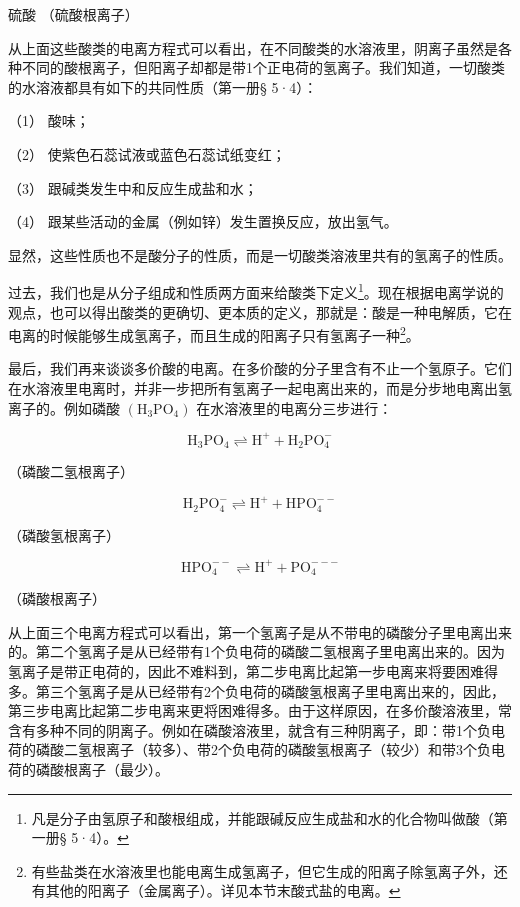 硫酸 （硫酸根离子）

从上面这些酸类的电离方程式可以看出，在不同酸类的水溶液里，阴离子虽然是各种不同的酸根离子，但阳离子却都是带1个正电荷的氢离子。我们知道，一切酸类的水溶液都具有如下的共同性质（第一册§
5·4）：

（1） 酸味；

（2） 使紫色石蕊试液或蓝色石蕊试纸变红；

（3） 跟碱类发生中和反应生成盐和水；

（4） 跟某些活动的金属（例如锌）发生置换反应，放出氢气。

显然，这些性质也不是酸分子的性质，而是一切酸类溶液里共有的氢离子的性质。

过去，我们也是从分子组成和性质两方面来给酸类下定义\footnote{凡是分子由氢原子和酸根组成，并能跟碱反应生成盐和水的化合物叫做酸（第一册§
  5·4）。}。现在根据电离学说的观点，也可以得出酸类的更确切、更本质的定义，那就是：酸是一种电解质，它在电离的时候能够生成氢离子，而且生成的阳离子只有氢离子一种\footnote{有些盐类在水溶液里也能电离生成氢离子，但它生成的阳离子除氢离子外，还有其他的阳离子（金属离子）。详见本节末酸式盐的电离。}。

最后，我们再来谈谈多价酸的电离。在多价酸的分子里含有不止一个氢原子。它们在水溶液里电离时，并非一步把所有氢离子一起电离出来的，而是分步地电离出氢离子的。例如磷酸
\(\left(\mathrm{H}_{3}\mathrm{PO}_{4}\right)\)
在水溶液里的电离分三步进行：

\[
\mathrm{H} _ {3} \mathrm{PO} _ {4} \rightleftharpoons \mathrm{H} ^ {+} + \mathrm{H} _ {2} \mathrm{PO} _ {4} ^ {-}
\]

（磷酸二氢根离子）

\[
\mathrm{H} _ {2} \mathrm{PO} _ {4} ^ {-} \rightleftharpoons \mathrm{H} ^ {+} + \mathrm{HPO} _ {4} ^ {- -}
\]

（磷酸氢根离子）

\[
\mathrm{HPO} _ {4} ^ {- -} \rightleftharpoons \mathrm{H} ^ {+} + \mathrm{PO} _ {4} ^ {- - -}
\]

（磷酸根离子）

从上面三个电离方程式可以看出，第一个氢离子是从不带电的磷酸分子里电离出来的。第二个氢离子是从已经带有1个负电荷的磷酸二氢根离子里电离出来的。因为氢离子是带正电荷的，因此不难料到，第二步电离比起第一步电离来将要困难得多。第三个氢离子是从已经带有2个负电荷的磷酸氢根离子里电离出来的，因此，第三步电离比起第二步电离来更将困难得多。由于这样原因，在多价酸溶液里，常含有多种不同的阴离子。例如在磷酸溶液里，就含有三种阴离子，即：带1个负电荷的磷酸二氢根离子（较多）、带2个负电荷的磷酸氢根离子（较少）和带3个负电荷的磷酸根离子（最少）。


